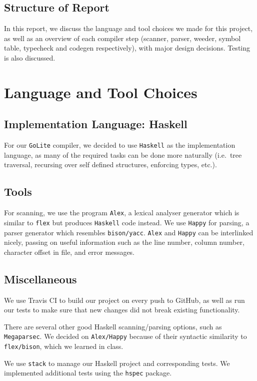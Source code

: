 \documentclass[11pt]{article}
\begin{document}
\subsection{Structure of Report}
In this report, we discuss the language and tool choices we made for
this project, as well as an overview of each compiler step (scanner,
parser, weeder, symbol table, typecheck and codegen respectively),
with major design decisions. Testing is also discussed.
\section{Language and Tool Choices}
\subsection{Implementation Language: Haskell}
For our \texttt{GoLite} compiler, we decided to use \texttt{Haskell}
as the implementation language, as many of the required tasks can be
done more naturally (i.e.\ tree traversal, recursing over self defined
structures, enforcing types, etc.).
\subsection{Tools}
For scanning, we use the program \texttt{Alex}\cite{github:alex}, a
lexical analyser generator which is similar to \texttt{flex} but
produces \texttt{Haskell} code instead. We use
\texttt{Happy}\cite{github:happy} for parsing, a parser generator
which resembles \texttt{bison/yacc}. \texttt{Alex} and \texttt{Happy}
can be interlinked nicely, passing on useful information such as the
line number, column number, character offset in file, and error
messages.
\subsection{Miscellaneous}
We use Travis CI\cite{travisci} to build our project on every push to
GitHub, as well as run our tests to make sure that new changes did not
break existing functionality.

There are several other good Haskell scanning/parsing options, such as
\texttt{Megaparsec}. We decided on \texttt{Alex/Happy} because of
their syntactic similarity to \texttt{flex/bison}, which we learned in
class.

We use \texttt{stack}\cite{hs:stack} to manage our Haskell project and
corresponding tests.  We implemented additional tests using the
\texttt{hspec}\cite{github:hspec} package.
\end{document}
